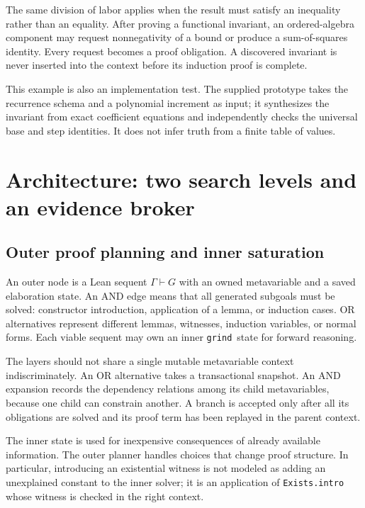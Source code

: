 \documentclass[11pt,a4paper]{article}
\newcommand{\grind}{\texttt{grind}}
\newcommand{\ctx}{\Gamma}
\newcommand{\judg}[2]{#1\vdash #2}
\begin{document}
The same division of labor applies when the result must satisfy an inequality rather than an equality. After proving a functional invariant, an ordered-algebra component may request nonnegativity of a bound or produce a sum-of-squares identity. Every request becomes a proof obligation. A discovered invariant is never inserted into the context before its induction proof is complete.

This example is also an implementation test. The supplied prototype takes the recurrence schema and a polynomial increment as input; it synthesizes the invariant from exact coefficient equations and independently checks the universal base and step identities. It does not infer truth from a finite table of values.

\section{Architecture: two search levels and an evidence broker}
\label{sec:architecture}

\subsection{Outer proof planning and inner saturation}

An outer node is a Lean sequent $\judg{\ctx}{G}$ with an owned metavariable and a saved elaboration state. An AND edge means that all generated subgoals must be solved: constructor introduction, application of a lemma, or induction cases. OR alternatives represent different lemmas, witnesses, induction variables, or normal forms. Each viable sequent may own an inner \grind\ state for forward reasoning.

The layers should not share a single mutable metavariable context indiscriminately. An OR alternative takes a transactional snapshot. An AND expansion records the dependency relations among its child metavariables, because one child can constrain another. A branch is accepted only after all its obligations are solved and its proof term has been replayed in the parent context.

The inner state is used for inexpensive consequences of already available information. The outer planner handles choices that change proof structure. In particular, introducing an existential witness is not modeled as adding an unexplained constant to the inner solver; it is an application of \texttt{Exists.intro} whose witness is checked in the right context.
\end{document}
